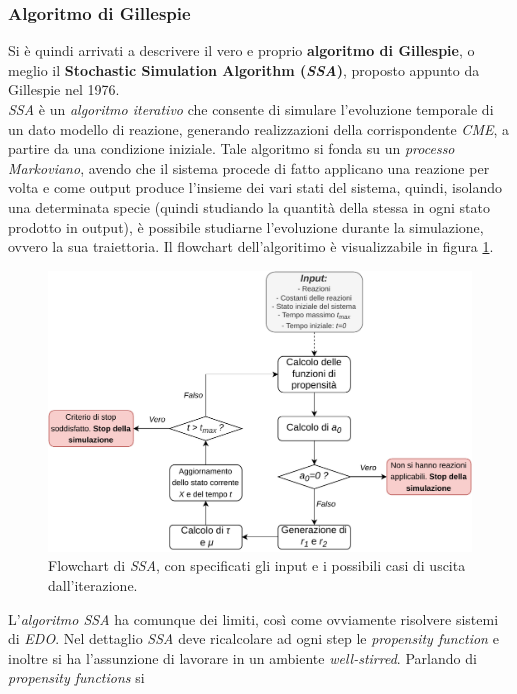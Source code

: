 \documentclass[a4paper,12pt, oneside]{book}
\begin{document}
\subsubsection{Algoritmo di Gillespie}
Si è quindi arrivati a descrivere il vero e proprio \textbf{algoritmo di
  Gillespie}, o meglio il \textbf{Stochastic Simulation Algorithm
  (\textit{SSA})}, proposto appunto da Gillespie nel 1976.\\
\textit{SSA} è un \textit{algoritmo iterativo} che consente di simulare
l'evoluzione temporale di un dato modello di reazione, generando realizzazioni
della corrispondente \textit{CME}, a partire da una condizione iniziale. Tale
algoritmo si fonda su un \textit{processo Markoviano}, avendo che il sistema
procede di fatto applicano una reazione per volta e come output produce
l'insieme dei vari stati del sistema, quindi, isolando una determinata specie 
(quindi studiando la quantità della stessa in ogni stato prodotto in output), è
possibile studiarne l'evoluzione durante la simulazione, ovvero la sua
traiettoria. Il flowchart dell'algoritimo è visualizzabile in figura
\ref{fig:gillflow}.
\begin{figure}
  \centering
  \includegraphics[width=\textwidth]{img/flowgill.pdf}
  \caption{Flowchart di \textit{SSA}, con specificati gli input e i possibili
    casi di uscita dall'iterazione.}
  \label{fig:gillflow}
\end{figure}
L'\textit{algoritmo SSA} ha comunque dei limiti, così come ovviamente risolvere
sistemi di \textit{EDO}. Nel dettaglio \textit{SSA} deve ricalcolare ad ogni
step le \textit{propensity function} e inoltre si ha l'assunzione di lavorare in
un ambiente \textit{well-stirred}. Parlando di \textit{propensity functions} si
\end{document}
